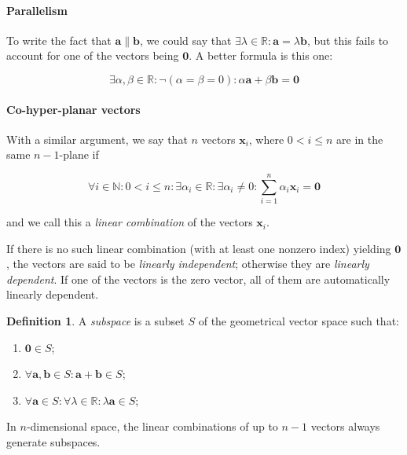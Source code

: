 \documentclass[12pt,a4paper]{report}
\numberwithin{equation}{section}
\theoremstyle{definition}
\newtheorem{definition}{Definition}[section]
\theoremstyle{remark}
\begin{document}
\paragraph{Parallelism}

To write the fact that $\mathbf{a} \parallel \mathbf{b}$, we could say that $\exists \lambda \in \mathbb{R}: \mathbf{a} = \lambda \mathbf{b}$, but this fails to account for one of the vectors being $\mathbf{0}$. A better formula is this one:

\begin{equation}
\exists \alpha , \beta \in \mathbb{R} : \neg (\alpha = \beta = 0 ):  \alpha \mathbf{a} + \beta \mathbf{b} = \mathbf{0}
\end{equation}

\paragraph{Co-hyper-planar vectors}

With a similar argument, we say that $n$ vectors $\mathbf{x}_i$, where $0<i\leq n$ are in the same $n-1$-plane if

\begin{equation}
\forall i \in \mathbb{N}: 0<i\leq n : \exists \alpha_i \in \mathbb{R}: \exists \alpha_i \neq 0 : \sum_{i=1}^n \alpha_i \mathbf{x}_i = \mathbf{0}
\end{equation}

and we call this a \emph{linear combination} of the vectors $\mathbf{x}_i$.

If there is no such linear combination (with at least one nonzero index) yielding $\mathbf{0}$, the vectors are said to be \emph{linearly independent}; otherwise they are \emph{linearly dependent}.
If one of the vectors is the zero vector, all of them are automatically linearly dependent.

\begin{definition}
A \emph{subspace} is a subset $S$ of the geometrical vector space such that:
\begin{enumerate}
\item $\mathbf{0} \in S$;
\item $\forall \mathbf{a}, \mathbf{b} \in S: \mathbf{a} + \mathbf{b} \in S $;
\item $\forall \mathbf{a} \in S: \forall \lambda \in \mathbb{R}: \lambda \mathbf{a} \in S$;
\end{enumerate}
\end{definition}

In $n$-dimensional space, the linear combinations of up to $n-1$ vectors always generate subspaces.
\end{document}
